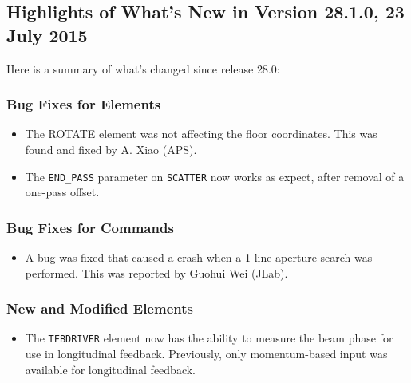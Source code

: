 \documentclass[11pt]{article}
\begin{document}
\subsection{Highlights of What's New in Version 28.1.0, 23 July 2015}

Here is a summary of what's changed since release 28.0:

\subsubsection{Bug Fixes for Elements}

\begin{itemize}
\item The ROTATE element was not affecting the floor coordinates. This was found and fixed by A. Xiao (APS).
\item The \verb|END_PASS| parameter on \verb|SCATTER| now works as expect, after removal of a one-pass offset.
\end{itemize}

\subsubsection{Bug Fixes for Commands}
\begin{itemize}
\item A bug was fixed that caused a crash when a 1-line aperture search was performed. This was reported by Guohui Wei (JLab).
\end{itemize}

\subsubsection{New and Modified Elements}
\begin{itemize}
\item The \verb|TFBDRIVER| element now has the ability to measure the beam phase for use in longitudinal feedback.
  Previously, only momentum-based input was available for longitudinal feedback.
\end{itemize}
\end{document}
